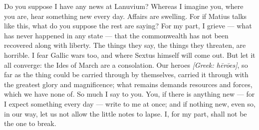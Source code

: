 

 Do you suppose I have any news at Lanuvium? Whereas I imagine you, where you are, hear something new every day. Affairs are swelling. For if Matius talks like this, what do you suppose the rest are saying? For my part, I grieve --- what has never happened in any state --- that the commonwealth has not been recovered along with liberty. The things they say, the things they threaten, are horrible. I fear Gallic wars too, and where Sextus himself will come out. But let it all converge: the Ides of March are a consolation. Our heroes \textit{[Greek: hērōes]}, so far as the thing could be carried through by themselves, carried it through with the greatest glory and magnificence; what remains demands resources and forces, which we have none of. So much I say to you. You, if there is anything new --- for I expect something every day --- write to me at once; and if nothing new, even so, in our way, let us not allow the little notes to lapse. I, for my part, shall not be the one to break.
